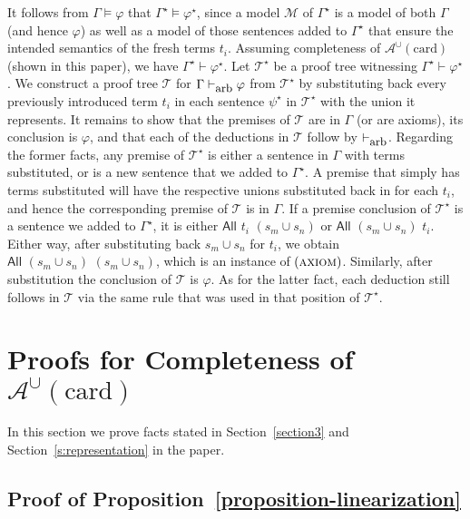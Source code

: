 \documentclass[letterpaper]{article} %
\theoremstyle{definition}
\newcommand{\Model}{\mathcal{M}}
\newcommand{\proves}{\vdash}
\newcommand{\Aunion}{\mathscr{A}^{\cup}}
\newcommand{\proverule}{\textsc}
\newcommand{\axiom}{\proverule{axiom}}
\newcommand{\All}[2]{\mathsf{All}\,\,#1\,\,#2}
\newcommand{\card}{\mathrm{card}}
\newcommand{\provesarbitrary}{\proves_{\mbox{\small{arb}}}}
\begin{document}
It follows from $\Gamma \models \varphi$ that $\Gamma^\star \models \varphi^\star$, since a model $\Model$ of $\Gamma^\star$ is a model of both $\Gamma$ (and hence $\varphi$) as well as a model of those sentences added to $\Gamma^\star$ that ensure the intended semantics of the fresh terms $t_i$.  Assuming completeness of $\Aunion(\card)$ (shown in this paper), we have $\Gamma^\star \proves \varphi^\star$.  Let $\mathcal{T}^\star$ be a proof tree witnessing $\Gamma^\star \proves \varphi^\star$.  We construct a proof tree $\mathcal{T}$ for $\Gamma \provesarbitrary \varphi$ from $\mathcal{T}^\star$ by substituting back every previously introduced term $t_i$ in each sentence $\psi^\star$ in $\mathcal{T}^\star$ with the union it represents.  It remains to show that the premises of $\mathcal{T}$ are in $\Gamma$ (or are axioms), its conclusion is $\varphi$, and that each of the deductions in $\mathcal{T}$ follow by $\provesarbitrary$.  
Regarding the former facts, any premise of $\mathcal{T}^\star$ is either a sentence in $\Gamma$ with terms substituted, or is a new sentence that we added to $\Gamma^\star$.  A premise that simply has terms substituted will have the respective unions substituted back in for each $t_i$, and hence the corresponding premise of $\mathcal{T}$ is in $\Gamma$.  If a premise conclusion of $\mathcal{T}^\star$ is a sentence we added to $\Gamma^\star$, it is either $\All{t_i}{(s_m \cup s_n)}$ or $\All{(s_m \cup s_n)}{t_i}$.  Either way, after substituting back $s_m \cup s_n$ for $t_i$, we obtain $\All{(s_m \cup s_n)}{(s_m \cup s_n)}$, which is an instance of $(\axiom)$.  Similarly, after substitution the conclusion of $\mathcal{T}$ is $\varphi$.  As for the latter fact, each deduction still follows in $\mathcal{T}$ via the same rule that was used in that position of $\mathcal{T}^\star$.


\section{Proofs for Completeness of $\Aunion(\card)$}
\label{s:supp:completeness-Aunioncard}

In this section we prove facts stated in Section~\ref{section3} and Section~\ref{s:representation} in the paper.

\subsection*{Proof of Proposition~\ref{proposition-linearization}}
\end{document}
